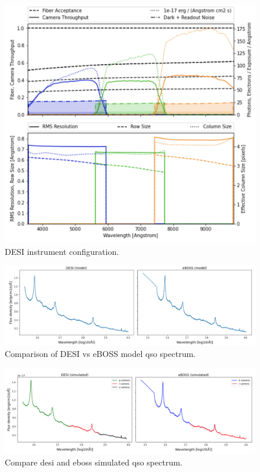 \begin{figure}[h]
\centering
\includegraphics[width=12cm]{images/specsim/desi_config.png}
\caption{DESI instrument configuration.}
\label{fig:desi_config}
\end{figure}



\begin{figure}[h]
\centering
\includegraphics[width=16cm]{images/specsim/model_comparison.png}
\caption{Comparison of DESI vs eBOSS model qso spectrum.}
\label{fig:model_comparison}
\end{figure}


\begin{figure}[h]
\centering
\includegraphics[width=16cm]{images/specsim/sim_comparison.png}
\caption{Compare desi and eboss simulated qso spectrum.}
\label{fig:sim_comparison}
\end{figure}

